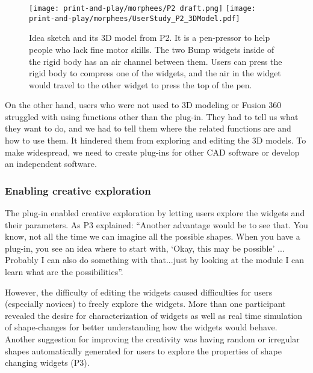           \begin{figure}
            \centering 
            \texttt{[image: print-and-play/morphees/P2 draft.png]} 
            \texttt{[image: print-and-play/morphees/UserStudy\_P2\_3DModel.pdf]}
            \caption{Idea sketch and its 3D model from P2. It is a pen-pressor
              to help people who lack fine motor skills. The two Bump widgets
              inside of the rigid body has an air channel between them. Users can
              press the rigid body to compress one of the widgets, and the air in
              the widget would travel to the other widget to press the top of the
              pen.}
            \label{fig:p2}
          \end{figure}
          
          On the other hand, users who were not used to 3D modeling or Fusion
          360 struggled with using functions other than the \mp plug-in.  They
          had to tell us what they want to do, and we had to tell them where the
          related functions are and how to use them. It hindered them from
          exploring and editing the 3D models. To make \mp widespread, we need
          to create plug-ins for other CAD software or develop an independent
          software.
                  
        \subsubsection{Enabling creative exploration}
          The plug-in enabled creative exploration by  letting users explore the
          widgets and their parameters.  As P3 explained: ``Another advantage
          would be to see that. You know, not all the time we can imagine all
          the possible shapes. When you have a plug-in, you see an idea where to
          start with, `Okay, this may be possible' ... Probably I can also do
          something with that...just by looking at the module I can learn what
          are the possibilities''.

          However, the difficulty of editing the widgets caused difficulties for
          users (especially novices) to freely explore the widgets. More than
          one participant revealed the desire for characterization of widgets as
          well as real time simulation of shape-changes for better understanding
          how the widgets would behave. Another suggestion for improving the
          creativity was having random or irregular shapes automatically
          generated for users to explore the properties of shape changing
          widgets (P3).
      
